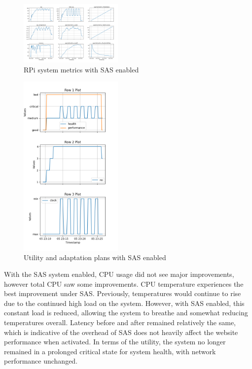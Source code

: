 \documentclass[conference]{IEEEtran}
\begin{document}
\begin{figure}[H]
    \centering
    \includegraphics[width=0.45\textwidth]{./media/after_SAS_metrics.png}
    \caption{RPi system metrics with SAS enabled}
    \label{fig:after_SAS_metrics}
\end{figure}

\begin{figure}[H]
    \centering
    \includegraphics[width=0.45\textwidth]{./media/after_SAS_utility_and_plans.png}
    \caption{Utility and adaptation plans with SAS enabled}
    \label{fig:after_SAS_utility_and_plans}
\end{figure}

With the SAS system enabled, CPU usage did not see major improvements, however total CPU saw some improvements. CPU temperature experiences the best improvement under SAS. Previously, temperatures would continue to rise due to the continued high load on the system. However, with SAS enabled, this constant load is reduced, allowing the system to breathe and somewhat reducing temperatures overall. Latency before and after remained relatively the same, which is indicative of the overhead of SAS does not heavily affect the website performance when activated. In terms of the utility, the system no longer remained in a prolonged critical state for system health, with network performance unchanged.
\end{document}
